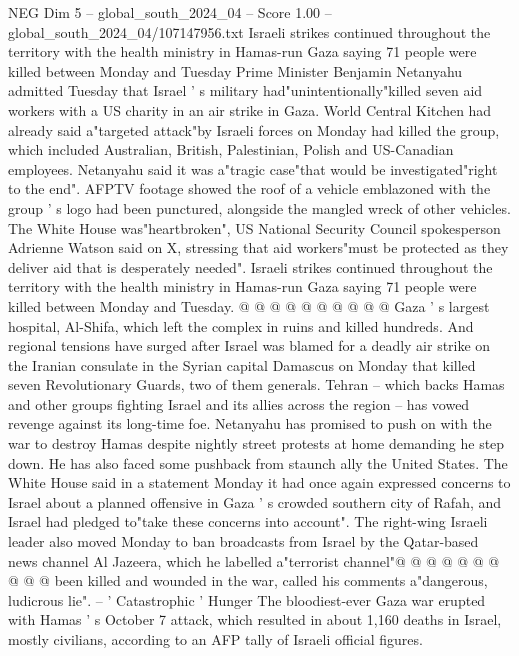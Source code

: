 \begin{textsample}{NEG Dim 5 – global\_south\_2024\_04 – Score 1.00 – global\_south\_2024\_04/107147956.txt}  \label{ex:f5_neg_115}
Israeli strikes continued throughout the territory with the health ministry in Hamas-run Gaza saying 71 people were killed between Monday and Tuesday Prime Minister Benjamin Netanyahu admitted Tuesday that Israel ' s military had"unintentionally"killed seven aid workers with a US charity in an air strike in Gaza.
World Central Kitchen had already said a"targeted attack"by Israeli forces on Monday had killed the group, which included Australian, British, Palestinian, Polish and US-Canadian employees.
Netanyahu said it was a"tragic case"that would be investigated"right to the end".
AFPTV footage showed the roof of a vehicle emblazoned with the group ' s logo had been punctured, alongside the mangled wreck of other vehicles.
The White House was"heartbroken", US National Security Council spokesperson Adrienne Watson said on X, stressing that aid workers"must be protected as they deliver aid that is desperately needed".
Israeli strikes continued throughout the territory with the health ministry in Hamas-run Gaza saying 71 people were killed between Monday and Tuesday. @ @ @ @ @ @ @ @ @ @ Gaza ' s largest hospital, Al-Shifa, which left the complex in ruins and killed hundreds.
And regional tensions have surged after Israel was blamed for a deadly air strike on the Iranian consulate in the Syrian capital Damascus on Monday that killed seven Revolutionary Guards, two of them generals.
Tehran -- which backs Hamas and other groups fighting Israel and its allies across the region -- has vowed revenge against its long-time foe.
Netanyahu has promised to push on with the war to destroy Hamas despite nightly street protests at home demanding he step down.
He has also faced some pushback from staunch ally the United States.
The White House said in a statement Monday it had once again expressed concerns to Israel about a planned offensive in Gaza ' s crowded southern city of Rafah, and Israel had pledged to"take these concerns into account".
The right-wing Israeli leader also moved Monday to ban broadcasts from Israel by the Qatar-based news channel Al Jazeera, which he labelled a"terrorist channel"@ @ @ @ @ @ @ @ @ @ been killed and wounded in the war, called his comments a"dangerous, ludicrous lie". -- ' Catastrophic ' Hunger The bloodiest-ever Gaza war erupted with Hamas ' s October 7 attack, which resulted in about 1,160 deaths in Israel, mostly civilians, according to an AFP tally of Israeli official figures.

\end{textsample}
